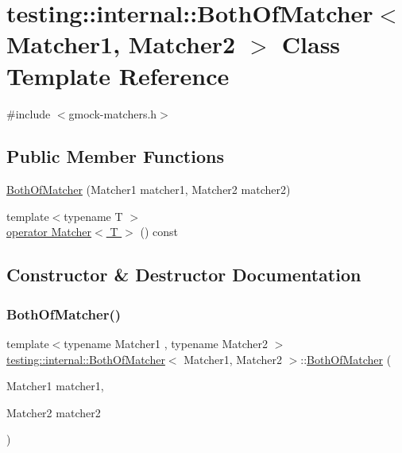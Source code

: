 \hypertarget{classtesting_1_1internal_1_1_both_of_matcher}{}\section{testing\+:\+:internal\+:\+:Both\+Of\+Matcher$<$ Matcher1, Matcher2 $>$ Class Template Reference}
\label{classtesting_1_1internal_1_1_both_of_matcher}


{\ttfamily \#include $<$gmock-\/matchers.\+h$>$}

\subsection*{Public Member Functions}
\begin{DoxyCompactItemize}
\item 
\hyperlink{classtesting_1_1internal_1_1_both_of_matcher_ab7941deda1965521f72d58b0dd429d6a}{Both\+Of\+Matcher} (Matcher1 matcher1, Matcher2 matcher2)
\item 
{\footnotesize template$<$typename T $>$ }\\\hyperlink{classtesting_1_1internal_1_1_both_of_matcher_a5846390364b763fbe31fb11f8c2e3180}{operator Matcher$<$ T $>$} () const
\end{DoxyCompactItemize}


\subsection{Constructor \& Destructor Documentation}
\mbox{\label{classtesting_1_1internal_1_1_both_of_matcher_ab7941deda1965521f72d58b0dd429d6a}} 
\subsubsection{\texorpdfstring{Both\+Of\+Matcher()}{BothOfMatcher()}}
{\footnotesize\ttfamily template$<$typename Matcher1 , typename Matcher2 $>$ \\
\hyperlink{classtesting_1_1internal_1_1_both_of_matcher}{testing\+::internal\+::\+Both\+Of\+Matcher}$<$ Matcher1, Matcher2 $>$\+::\hyperlink{classtesting_1_1internal_1_1_both_of_matcher}{Both\+Of\+Matcher} (\begin{DoxyParamCaption}\item[{Matcher1}]{matcher1,  }\item[{Matcher2}]{matcher2 }\end{DoxyParamCaption})\hspace{0.3cm}{\ttfamily [inline]}}



